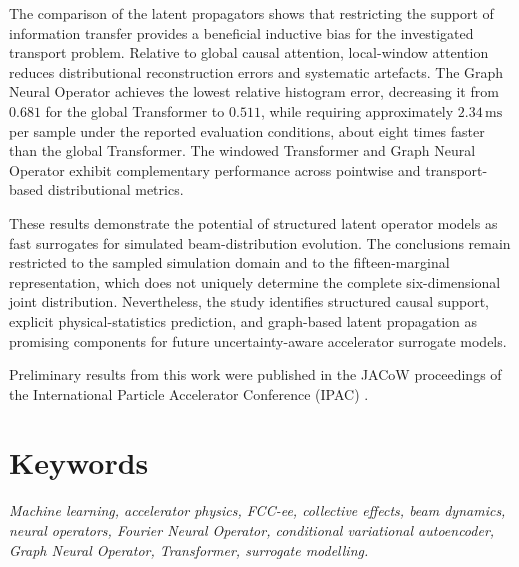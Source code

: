 \documentclass[11pt,a4paper]{article}
\begin{document}
\begin{sloppypar}
The comparison of the latent propagators shows that restricting the support of information transfer provides a beneficial inductive bias for the investigated transport problem. Relative to global causal attention, local-window attention reduces distributional reconstruction errors and systematic artefacts. The Graph Neural Operator achieves the lowest relative histogram error, decreasing it from \(0.681\) for the global Transformer to \(0.511\), while requiring approximately \(2.34\,\mathrm{ms}\) per sample under the reported evaluation conditions, about eight times faster than the global Transformer. The windowed Transformer and Graph Neural Operator exhibit complementary performance across pointwise and transport-based distributional metrics.

These results demonstrate the potential of structured latent operator models as fast surrogates for simulated beam-distribution evolution. The conclusions remain restricted to the sampled simulation domain and to the fifteen-marginal representation, which does not uniquely determine the complete six-dimensional joint distribution. Nevertheless, the study identifies structured causal support, explicit physical-statistics prediction, and graph-based latent propagation as promising components for future uncertainty-aware accelerator surrogate models.

Preliminary results from this work were published in the JACoW proceedings of the International Particle Accelerator Conference (IPAC)
\cite{my_paper}.

\section*{Keywords}

\textit{Machine learning, accelerator physics, FCC-ee, collective effects, beam dynamics, neural operators, Fourier Neural Operator, conditional variational autoencoder, Graph Neural Operator, Transformer, surrogate modelling.}


\clearpage
{}
\pagestyle{plain}




  

  


\newpage
\nocite{*}
\printbibliography



\end{sloppypar}
\end{document}
